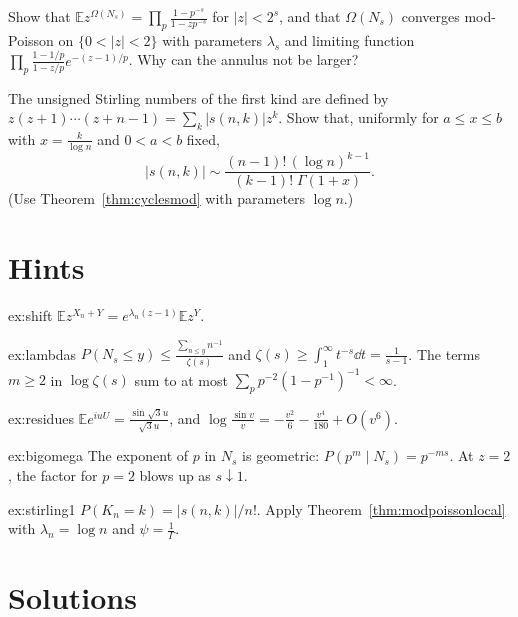 \begin{exercise}[$\star\star$]\label{ex:bigomega}
Show that $\mathbb Ez^{\Omega(N_s)}=\prod_p\frac{1-p^{-s}}{1-zp^{-s}}$ for $|z|<2^s$, and that $\Omega(N_s)$ converges mod-Poisson on $\{0<|z|<2\}$ with parameters $\lambda_s$ and limiting function
$\prod_p\frac{1-1/p}{1-z/p}e^{-(z-1)/p}$. Why can the annulus not be larger?
\end{exercise}

\begin{exercise}[$\star\star$]\label{ex:stirling1}
The unsigned Stirling numbers of the first kind are defined by $z(z+1)\cdots(z+n-1)=\sum_k|s(n,k)|z^k$. Show that, uniformly for $a\le x\le b$ with $x=\frac k{\log n}$ and $0<a<b$ fixed,
\[
|s(n,k)|\sim\frac{(n-1)!\,(\log n)^{k-1}}{(k-1)!\;\Gamma(1+x)}.
\]
(Use Theorem~\ref{thm:cyclesmod} with parameters $\log n$.)
\end{exercise}

\section{Hints}

\begin{hint}{ex:shift}
$\mathbb Ez^{X_n+Y}=e^{\lambda_n(z-1)}\mathbb Ez^Y$.
\end{hint}
\begin{hint}{ex:lambdas}
$P(N_s\le y)\le\frac{\sum_{n\le y}n^{-1}}{\zeta(s)}$ and $\zeta(s)\ge\int_1^\infty t^{-s}\dd t=\frac1{s-1}$. The terms $m\ge2$ in $\log\zeta(s)$ sum to at most $\sum_pp^{-2}(1-p^{-1})^{-1}<\infty$.
\end{hint}
\begin{hint}{ex:residues}
$\mathbb Ee^{iuU}=\frac{\sin\sqrt3u}{\sqrt3u}$, and $\log\frac{\sin v}v=-\frac{v^2}6-\frac{v^4}{180}+O(v^6)$.
\end{hint}
\begin{hint}{ex:bigomega}
The exponent of $p$ in $N_s$ is geometric: $P(p^m\mid N_s)=p^{-ms}$. At $z=2$, the factor for $p=2$ blows up as $s\downarrow1$.
\end{hint}
\begin{hint}{ex:stirling1}
$P(K_n=k)=|s(n,k)|/n!$. Apply Theorem~\ref{thm:modpoissonlocal} with $\lambda_n=\log n$ and $\psi=\frac1\Gamma$.
\end{hint}

\section{Solutions}

